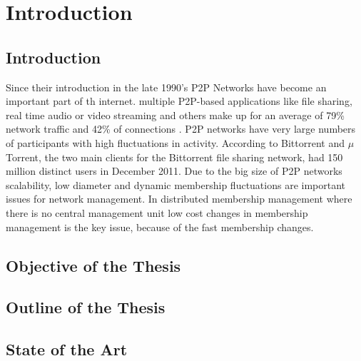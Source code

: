 \chapter{Introduction} 
\label{chap:introduction}

\section{Introduction}
Since their introduction in the late 1990's P2P Networks have become an
important part of th internet. multiple P2P-based applications like file
sharing, real time audio or video streaming and others make up for an average of
79\% network traffic and 42\% of connections \cite{John+:InetTraffic}. P2P
networks have very large numbers of participants with high fluctuations in
activity. According to \cite{bittorrent} Bittorrent and $\mu$Torrent, the two
main clients for the Bittorrent file sharing network, had 150 million distinct users in
December 2011. Due to the big size of P2P networks scalability, low diameter and
dynamic membership fluctuations are important issues for network management. In
distributed membership management where there is no central management unit low
cost changes in membership management is the key issue, because of the fast
membership changes.

\section{Objective of the Thesis} 
\section{Outline of the Thesis} %
\section{State of the Art} %